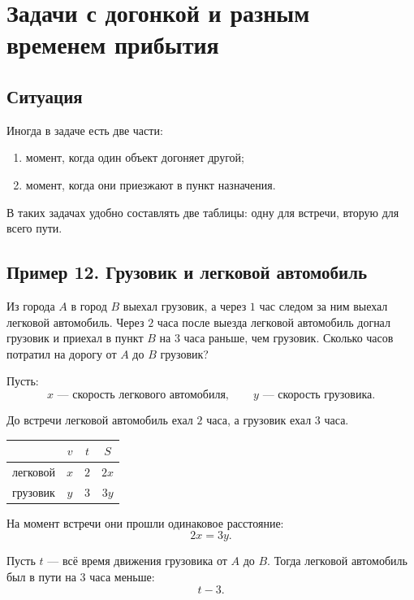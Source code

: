 \documentclass[a4paper,12pt]{article}
\begin{document}
\section{Задачи с догонкой и разным временем прибытия}

\subsection{Ситуация}

Иногда в задаче есть две части:

\begin{enumerate}
    \item момент, когда один объект догоняет другой;
    \item момент, когда они приезжают в пункт назначения.
\end{enumerate}

В таких задачах удобно составлять две таблицы: одну для встречи, вторую для всего пути.

\subsection{Пример 12. Грузовик и легковой автомобиль}

Из города $A$ в город $B$ выехал грузовик, а через $1$ час следом за ним выехал легковой автомобиль. Через $2$ часа после выезда легковой автомобиль догнал грузовик и приехал в пункт $B$ на $3$ часа раньше, чем грузовик. Сколько часов потратил на дорогу от $A$ до $B$ грузовик?

Пусть:
\[
x \text{ --- скорость легкового автомобиля}, \qquad
y \text{ --- скорость грузовика}.
\]

До встречи легковой автомобиль ехал $2$ часа, а грузовик ехал $3$ часа.

\begin{center}
\renewcommand{\arraystretch}{1.35}
\begin{tabularx}{0.75\linewidth}{X c c c}
\toprule
 & $v$ & $t$ & $S$ \\
\midrule
легковой & $x$ & $2$ & $2x$ \\
грузовик & $y$ & $3$ & $3y$ \\
\bottomrule
\end{tabularx}
\end{center}

На момент встречи они прошли одинаковое расстояние:
\[
2x=3y.
\]

Пусть $t$ --- всё время движения грузовика от $A$ до $B$. Тогда легковой автомобиль был в пути на $3$ часа меньше:
\[
t-3.
\]
\end{document}

